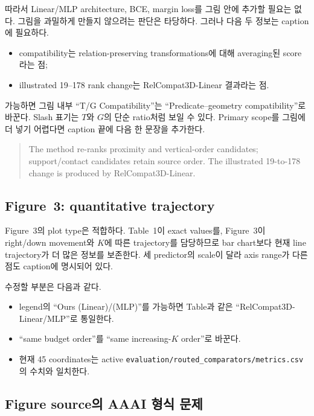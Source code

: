 \documentclass[11pt]{article}
\newcommand{\fileline}[1]{\texttt{#1}}
\begin{document}
따라서 Linear/MLP architecture, BCE, margin loss를 그림 안에 추가할 필요는 없다.
그림을 과밀하게 만들지 않으려는 판단은 타당하다. 그러나 다음 두 정보는 caption에
필요하다.

\begin{itemize}[leftmargin=2em]
    \item compatibility는 relation-preserving transformations에 대해 averaging된
    score라는 점;
    \item illustrated 19--178 rank change는 RelCompat3D-Linear 결과라는 점.
\end{itemize}

가능하면 그림 내부 ``T/G Compatibility''는 ``Predicate--geometry compatibility''로
바꾼다. Slash 표기는 $T$와 $G$의 단순 ratio처럼 보일 수 있다. Primary scope를 그림에
더 넣기 어렵다면 caption 끝에 다음 한 문장을 추가한다.

\begin{quote}
The method re-ranks proximity and vertical-order candidates; support/contact
candidates retain source order. The illustrated 19-to-178 change is produced by
RelCompat3D-Linear.
\end{quote}

\subsection{Figure~3: quantitative trajectory}

Figure~3의 plot type은 적합하다. Table~1이 exact values를, Figure~3이 right/down
movement와 $K$에 따른 trajectory를 담당하므로 bar chart보다 현재 line trajectory가
더 많은 정보를 보존한다. 세 predictor의 scale이 달라 axis range가 다른 점도 caption에
명시되어 있다.

수정할 부분은 다음과 같다.

\begin{itemize}[leftmargin=2em]
    \item legend의 ``Ours (Linear)/(MLP)''를 가능하면 Table과 같은
    ``RelCompat3D-Linear/MLP''로 통일한다.
    \item ``same budget order''를 ``same increasing-$K$ order''로 바꾼다.
    \item 현재 45 coordinates는 active
    \fileline{evaluation/routed_comparators/metrics.csv}의 수치와 일치한다.
\end{itemize}

\subsection{Figure source의 AAAI 형식 문제}
\end{document}
